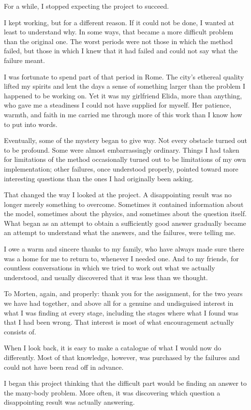 For a while, I stopped expecting the project to succeed.

I kept working, but for a different reason. If it could not be done, I wanted at least
to understand why. In some ways, that became a more difficult problem than the original
one. The worst periods were not those in which the method failed, but those in which I
knew that it had failed and could not say what the failure meant.

I was fortunate to spend part of that period in Rome. 
The city’s ethereal quality lifted my spirits and lent the days a sense of something 
larger than the problem I happened to be working on.
Yet it was my girlfriend Elida, more than anything, 
who gave me a steadiness I could not have supplied for myself. 
Her patience, warmth, 
and faith in me carried me through more of this work than I know how to put into words.

Eventually, some of the mystery began to give way. Not every obstacle turned out to be
profound. Some were almost embarrassingly ordinary. Things I had taken for limitations
of the method occasionally turned out to be limitations of my own implementation; other
failures, once understood properly, pointed toward more interesting questions than the
ones I had originally been asking.

That changed the way I looked at the project. A disappointing result was no longer
merely something to overcome. Sometimes it contained information about the model,
sometimes about the physics, and sometimes about the question itself. What began as an
attempt to obtain a sufficiently good answer gradually became an attempt to understand
what the answers, and the failures, were telling me.

\bigskip

I owe a warm and sincere thanks to my family, who have always made sure there was a home
for me to return to, whenever I needed one. And to my friends, for countless
conversations in which we tried to work out what we actually understood, and usually
discovered that it was less than we thought.

To Morten, again, and properly: thank you for the assignment, for the two years we have
had together, and above all for a genuine and undisguised interest in what I was finding
at every stage, including the stages where what I found was that I had been wrong. That
interest is most of what encouragement actually consists of.

\bigskip

When I look back, it is easy to make a catalogue of what I would now do differently.
Most of that knowledge, however, was purchased by the failures and could not have been
read off in advance. 

I began this project thinking that the difficult part would be finding an answer to the
many-body problem. More often, it was discovering which question a disappointing result
was actually answering.

\clearpage
